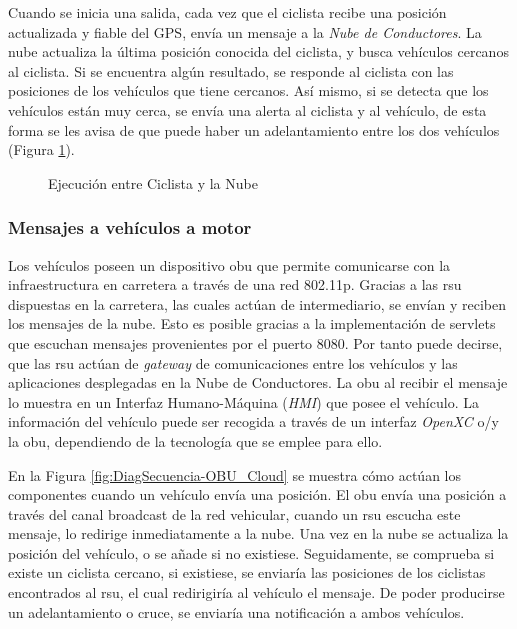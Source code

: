 Cuando se inicia una salida, cada vez que el ciclista recibe una posición actualizada y fiable del GPS, envía un mensaje a la \emph{Nube de Conductores}. La nube actualiza la última posición conocida del ciclista, y busca vehículos cercanos al ciclista. Si se encuentra algún resultado, se responde al ciclista con las posiciones de los vehículos que tiene cercanos. Así mismo, si se detecta que los vehículos están muy cerca, se envía una alerta al ciclista y al vehículo, de esta forma se les avisa de que puede haber un adelantamiento entre los dos vehículos (Figura \ref{fig:DiagSecuencia-Ciclista_Cloud}).
\begin{figure}[h]
	\begin{center}
		\caption{Ejecución entre Ciclista y la Nube}
		\label{fig:DiagSecuencia-Ciclista_Cloud}
	\end{center}
\end{figure}

\subsubsection{Mensajes a vehículos a motor}\label{sssection:mensajesvehiculomotor}
Los vehículos poseen un dispositivo \gls{obu} que permite comunicarse con la infraestructura en carretera a través de una red \gls{802.11p}. Gracias a las \gls{rsu} dispuestas en la carretera, las cuales actúan de intermediario, se envían y reciben los mensajes de la nube. Esto es posible gracias a la implementación de servlets que escuchan mensajes provenientes por el puerto 8080. Por tanto puede decirse, que las \gls{rsu} actúan de \emph{gateway} de comunicaciones entre los vehículos y las aplicaciones desplegadas en la Nube de Conductores. La \gls{obu} al recibir el mensaje lo muestra en un Interfaz Humano-Máquina (\emph{HMI}) que posee el vehículo. La información del vehículo puede ser recogida a través de un interfaz \emph{OpenXC} o/y la \gls{obu}, dependiendo de la tecnología que se emplee para ello.

En la Figura \ref{fig:DiagSecuencia-OBU_Cloud} se muestra cómo actúan los componentes cuando un vehículo envía una posición. El \gls{obu} envía una posición a través del canal broadcast de la red vehicular, cuando un \gls{rsu} escucha este mensaje, lo redirige inmediatamente a la nube. Una vez en la nube se actualiza la posición del vehículo, o se añade si no existiese. Seguidamente, se comprueba si existe un ciclista cercano, si existiese, se enviaría las posiciones de los ciclistas encontrados al \gls{rsu}, el cual redirigiría al vehículo el mensaje. De poder producirse un adelantamiento o cruce, se enviaría una notificación a ambos vehículos.

